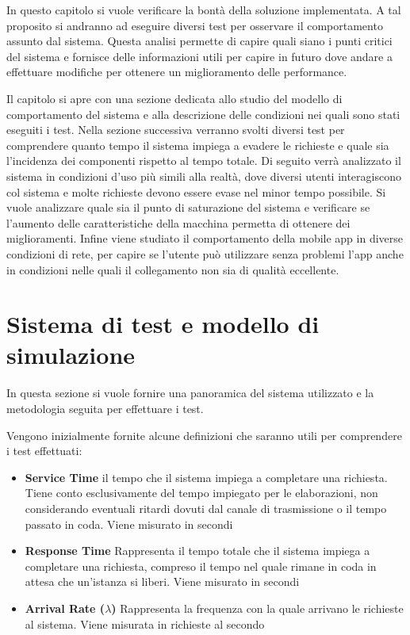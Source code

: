In questo capitolo si vuole verificare la bontà della soluzione implementata. A tal proposito si andranno ad eseguire diversi test per osservare il comportamento assunto dal sistema. Questa analisi permette di capire quali siano i punti critici del sistema e fornisce delle informazioni utili per capire in futuro dove andare a effettuare modifiche per ottenere un miglioramento delle performance.

Il capitolo si apre con una sezione dedicata allo studio del modello di comportamento del sistema e alla descrizione delle condizioni nei quali sono stati eseguiti i test. Nella sezione successiva verranno svolti diversi test per comprendere quanto tempo il sistema impiega a evadere le richieste e quale sia l'incidenza dei componenti rispetto al tempo totale. Di seguito verrà analizzato il sistema in condizioni d'uso più simili alla realtà, dove diversi utenti interagiscono col sistema e molte richieste devono essere evase nel minor tempo possibile. Si vuole analizzare quale sia il punto di saturazione del sistema e verificare se l'aumento delle caratteristiche della macchina permetta di ottenere dei miglioramenti. Infine viene studiato il comportamento della mobile app in diverse condizioni di rete, per capire se l'utente può utilizzare senza problemi l'app anche in condizioni nelle quali il collegamento non sia di qualità eccellente.

\section{Sistema di test e modello di simulazione\label{sec:sistema-e-modello}}

In questa sezione si vuole fornire una panoramica del sistema utilizzato e la metodologia seguita per effettuare i test.

Vengono inizialmente fornite alcune definizioni che saranno utili per comprendere i test effettuati:

\begin{itemize}
	\item \textbf{Service Time}
	\upe il tempo che il sistema impiega a completare una richiesta. Tiene conto esclusivamente del tempo impiegato per le elaborazioni, non considerando eventuali ritardi dovuti dal canale di trasmissione o il tempo passato in coda. Viene misurato in secondi
	\item \textbf{Response Time}
	Rappresenta il tempo totale che il sistema impiega a completare una richiesta, compreso il tempo nel quale rimane in coda in attesa che un'istanza si liberi. Viene misurato in secondi
	\item \textbf{Arrival Rate ($ \lambda $)}
	Rappresenta la frequenza con la quale arrivano le richieste al sistema. Viene misurata in richieste al secondo
\end{itemize}

